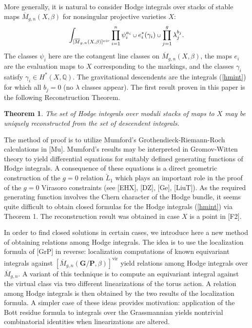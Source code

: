 \documentclass[11 pt]{amsart}
\newtheorem{tm}{Theorem}
\newcommand{\Q}{\mathbb{Q}}
\newcommand{\mgn}{\overline{M}_{g,n}}
\def\scup{\mathbin{\text{\scriptsize$\cup$}}}
\begin{document}
More generally, it is natural to consider Hodge integrals
over stacks of stable maps $\mgn(X,\beta)$ for nonsingular
projective varieties $X$:
\begin{equation}
\label{hmint}
\int_{[\mgn(X,\beta)]^{vir}} 
\prod_{i=1}^n \psi_i^{a_i} \scup e_i^*(\gamma_i)
\scup \prod_{j=1}^g \lambda_j^{b_j}.
\end{equation} 
The classes $\psi_i$ here are the  cotangent line
classes on $\mgn(X,\beta)$, the maps $e_i$ are the evaluation
maps to $X$ corresponding to the markings, and the classes
$\gamma_i$ satisfy
$\gamma_i \in H^*(X, \Q)$. 
The gravitational descendents are the integrals 
(\ref{hmint}) for which all $b_j=0$ 
(no $\lambda$ classes appear). 
The first result proven in this paper is the
following Reconstruction Theorem.
\begin{tm}
\label{recon}
The set of Hodge integrals over moduli stacks of
maps to $X$ may be uniquely reconstructed from the
set of descendent integrals. 
\end{tm}
The method of proof is to utilize Mumford's
Grothendieck-Riemann-Roch calculations in [Mu]. Mumford's
results may be interpreted in Gromov-Witten theory to
yield differential equations for suitably
defined generating functions of Hodge integrals. 
A consequence of these equations is a direct
geometric construction of the $g=0$ relation $\tilde{L}_1$
which plays an important role in the proof
of the $g=0$ Virasoro constraints (see [EHX], [DZ], [Ge], [LiuT]).
As the required generating function
involves the Chern character of the Hodge bundle, it
seems quite difficult to obtain closed formulas for
the Hodge integrals (\ref{hmint}) via Theorem 1.
The reconstruction result was obtained 
in case $X$ is a point in [F2]. 


 
In order to find closed solutions in certain cases,
we introduce here a new method of obtaining relations among
Hodge integrals. The idea is to use the localization formula of
[GrP] in reverse: localization computations of known equivariant
integrals against $[\overline{M}_{g,n}(\mathbf{G}/\mathbf{P}, \beta)]^
{\text{vir}}$
yield relations among Hodge integrals over $\mgn$. 
A variant of this technique
is to compute an equivariant integral against the virtual class
via two different linearizations of the torus action. A relation
among Hodge integrals is then obtained by the two results of the
localization formula. A simpler case of these ideas provides motivation:
application of the Bott residue formula to integrals
over the Grassmannian 
yields nontrivial combinatorial identities when linearizations
are altered. 
\end{document}
